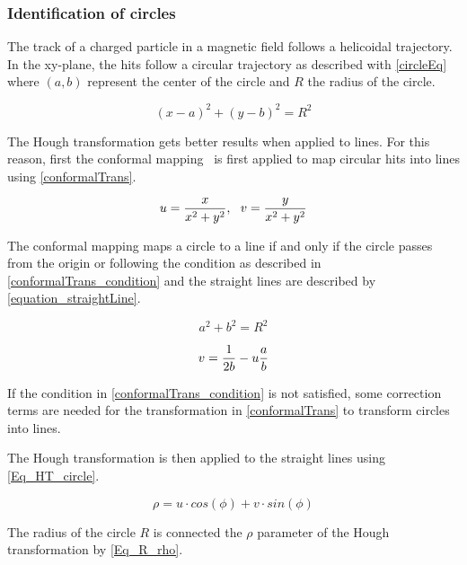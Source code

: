 \documentclass{cernatsnote}
\begin{document}
\subsubsection{Identification of circles}

The track of a charged particle in a magnetic field follows a helicoidal trajectory. In the xy-plane, the hits follow a circular trajectory as described with \cref{circleEq} where $(a, b)$ represent the center of the circle and $R$ the radius of the circle.

\begin{equation}
  {(x-a)}^2 + {(y-b)}^2 = R^2
	\label{circleEq}
\end{equation}

The Hough transformation gets better results when applied to lines. For this reason, first the conformal mapping~\cite{Hansroul:1988wa} is first applied to map circular hits into lines using \cref{conformalTrans}.

\begin{equation}
  u = {{x} \over {x^2+y^2}} , \,\,\,\, v = {{y} \over {x^2+y^2}}
	\label{conformalTrans}
\end{equation}

The conformal mapping maps a circle to a line if and only if the circle passes from the origin or following the condition as described in \cref{conformalTrans_condition} and the straight lines are described by \cref{equation_straightLine}.

\begin{equation}
  a^2 + b^2 = R^2
	\label{conformalTrans_condition}
\end{equation}

\begin{equation}
  v = {1 \over {2b}} - u {a \over b}
	\label{equation_straightLine}
\end{equation}

If the condition in \cref{conformalTrans_condition} is not satisfied, some correction terms are needed for the transformation in \cref{conformalTrans} to transform circles into lines.

The Hough transformation is then applied to the straight lines using \cref{Eq_HT_circle}.

\begin{equation}
	\rho = u \cdot cos(\phi) + v \cdot sin(\phi)
	\label{Eq_HT_circle}
\end{equation}

The radius of the circle $R$ is connected the $\rho$ parameter of the Hough transformation by \cref{Eq_R_rho}.
\end{document}
